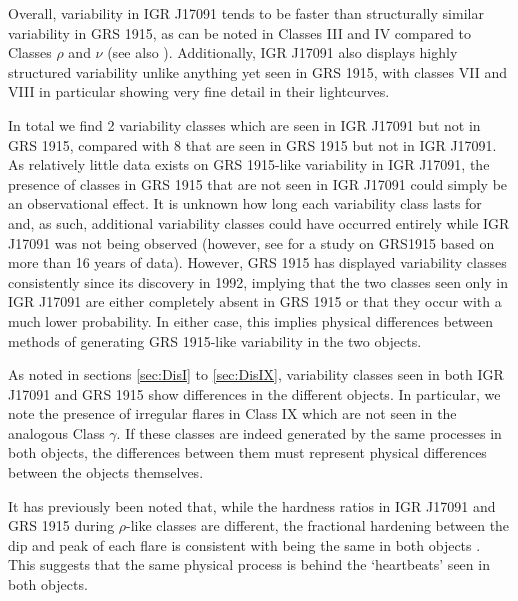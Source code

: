 \par Overall, variability in IGR J17091 tends to be faster than structurally similar variability in GRS 1915, as can be noted in Classes III and IV compared to Classes $\rho$ and $\nu$ (see also \citealp{Altamirano_IGR_FH}).  Additionally, IGR J17091 also displays highly structured variability unlike anything yet seen in GRS 1915, with classes VII and VIII in particular showing very fine detail in their lightcurves.
\par In total we find 2 variability classes which are seen in IGR J17091 but not in GRS 1915, compared with 8 that are seen in GRS 1915 but not in IGR J17091.  As relatively little data exists on GRS 1915-like variability in IGR J17091, the presence of classes in GRS 1915 that are not seen in IGR J17091 could simply be an observational effect.  It is unknown how long each variability class lasts for and, as such, additional variability classes could have occurred entirely while IGR J17091 was not being observed (however, see \citealp{Huppenkothen_ML} for a study on GRS1915 based on more than 16 years of data).  However, GRS 1915 has displayed variability classes consistently since its discovery in 1992, implying that the two classes seen only in IGR J17091 are either completely absent in GRS 1915 or that they occur with a much lower probability.  In either case, this implies physical differences between methods of generating GRS 1915-like variability in the two objects.  
\par As noted in sections \ref{sec:DisI} to \ref{sec:DisIX}, variability classes seen in both IGR J17091 and GRS 1915 show differences in the different objects.  In particular, we note the presence of irregular flares in Class IX which are not seen in the analogous Class $\gamma$.  If these classes are indeed generated by the same processes in both objects, the differences between them must represent physical differences between the objects themselves.
\par It has previously been noted that, while the hardness ratios in IGR J17091 and GRS 1915 during $\rho$-like classes are different, the fractional hardening between the dip and peak of each flare is consistent with being the same in both objects \citep{Capitanio_peculiar}.  This suggests that the same physical process is behind the `heartbeats' seen in both objects.
